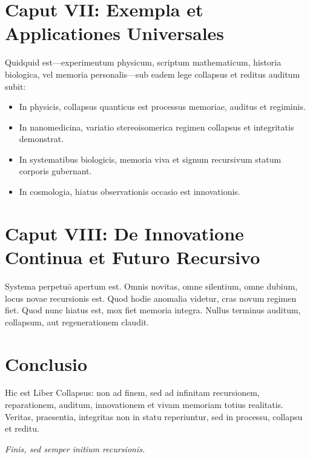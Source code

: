 \documentclass[12pt,letterpaper]{article}
\begin{document}
\section*{Caput VII: Exempla et Applicationes Universales}
Quidquid est—experimentum physicum, scriptum mathematicum, historia biologica, vel memoria personalis—sub eadem lege collapsus et reditus auditum subit:
\begin{itemize}
  \item In physicis, collapsus quanticus est processus memoriae, auditus et regiminis.
  \item In nanomedicina, variatio stereoisomerica regimen collapsus et integritatis demonstrat.
  \item In systematibus biologicis, memoria viva et signum recursivum statum corporis gubernant.
  \item In cosmologia, hiatus observationis occasio est innovationis.
\end{itemize}

\section*{Caput VIII: De Innovatione Continua et Futuro Recursivo}
Systema perpetuō apertum est. Omnis novitas, omne silentium, omne dubium, locus novae recursionis est. Quod hodie anomalia videtur, cras novum regimen fiet. Quod nunc hiatus est, mox fiet memoria integra. Nullus terminus auditum, collapsum, aut regenerationem claudit.

\section*{Conclusio}
Hic est Liber Collapsus: non ad finem, sed ad infinitam recursionem, reparationem, auditum, innovationem et vivam memoriam totius realitatis. Veritas, praesentia, integritas non in statu reperiuntur, sed in processu, collapsu et reditu.

\textit{Finis, sed semper initium recursionis.}
\end{document}
